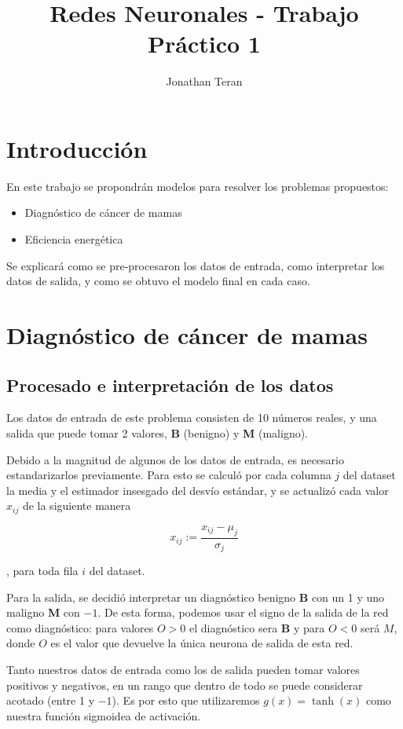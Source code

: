 \documentclass[a4paper,10pt]{article}
\author{Jonathan Teran}
\title{Redes Neuronales - Trabajo Práctico 1}
\date{}
\begin{document}
\maketitle

\section{Introducción}

En este trabajo se propondrán modelos para resolver los problemas propuestos:

\begin{itemize}
	\item Diagnóstico de cáncer de mamas
	\item Eficiencia energética
\end{itemize}

Se explicará como se pre-procesaron los datos de entrada, como interpretar
los datos de salida, y como se obtuvo el modelo final en cada caso.

\section{Diagnóstico de cáncer de mamas}

\subsection{Procesado e interpretación de los datos}

Los datos de entrada de este problema consisten de 10 números reales, y una
salida que puede tomar 2 valores, \textbf{B} (benigno) y \textbf{M} (maligno).

Debido a la magnitud de algunos de los datos de entrada, es necesario
estandarizarlos previamente. Para esto se calculó por cada columna $j$ del
dataset la media y el estimador insesgado del desvío estándar,
y se actualizó cada valor $x_{ij}$ de la siguiente manera

\[ x_{ij} := \frac{x_{ij} - \mu_j}{\sigma_j} \]

, para toda fila $i$ del dataset.

Para la salida, se decidió interpretar un diagnóstico benigno \textbf{B} con
un 1 y uno maligno \textbf{M} con $-1$. De esta forma, podemos usar el signo
de la salida de la red como diagnóstico: para valores $O > 0$ el diagnóstico
sera \textbf{B} y para $O < 0$ será $M$, donde $O$ es el valor que devuelve la
única neurona de salida de esta red.

Tanto nuestros datos de entrada como los de salida pueden tomar valores
positivos y negativos, en un rango que dentro de todo se puede considerar
acotado (entre 1 y $-1$). Es por esto que utilizaremos $g(x) = \tanh(x)$ como
nuestra función sigmoidea de activación.
\end{document}
